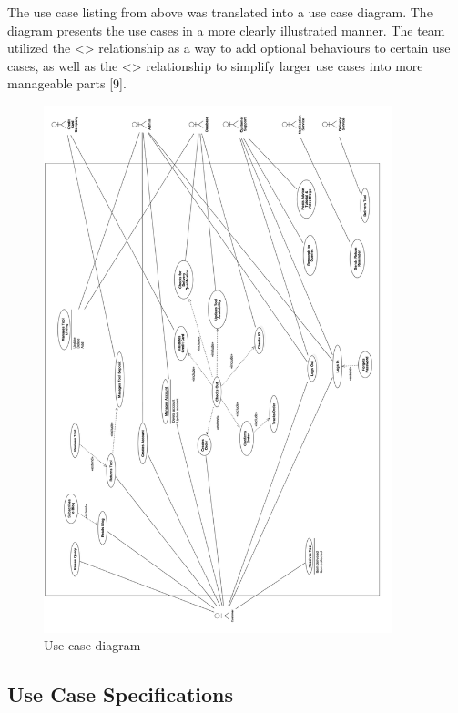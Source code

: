 \documentclass[fontsize=11pt]{extarticle}
\numberwithin{figure}{section} %
\numberwithin{table}{section}%
\begin{document}
The use case listing from above was translated into a use case diagram.
The diagram presents the use cases in a more clearly illustrated manner.
The team utilized the \textless{}\textgreater{} relationship as a way to
add optional behaviours to certain use cases, as well as the
\textless{}\textgreater{} relationship to simplify larger use cases into
more manageable parts {[}9{]}.

\begin{figure}[H]
      \centering
      \includegraphics[trim = 0 0 0 0, clip, width=0.9\textwidth]{TempImg/UCDiagram.png}
      \caption{Use case diagram}
 \end{figure}

\hypertarget{use-case-specifications}{%
\subsection{Use Case Specifications}\label{use-case-specifications}}
\end{document}
